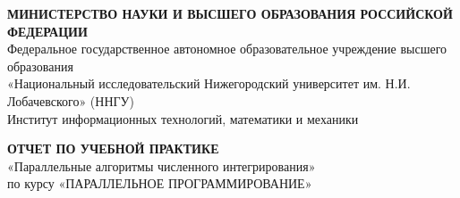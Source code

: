 \documentclass[14pt,a4paper]{article}
\begin{document}
\begin{titlepage}
\begin{center}

\onehalfspacing

\begin{center}
    \textbf{МИНИСТЕРСТВО НАУКИ И ВЫСШЕГО ОБРАЗОВАНИЯ РОССИЙСКОЙ ФЕДЕРАЦИИ} \\
    Федеральное государственное автономное образовательное учреждение высшего образования \\
    «Национальный исследовательский Нижегородский университет им. Н.И. Лобачевского» (ННГУ) \\
    Институт информационных технологий, математики и механики
\end{center}

\vspace{4cm}

\begin{center}
    \textbf{ОТЧЕТ ПО УЧЕБНОЙ ПРАКТИКЕ} \vspace{0.5cm}\\
    «Параллельные алгоритмы численного интегрирования» \vspace{0.5cm}\\
    по курсу «ПАРАЛЛЕЛЬНОЕ ПРОГРАММИРОВАНИЕ»
\end{center}

\vspace{4cm}


\end{center}
\end{titlepage}
\end{document}
